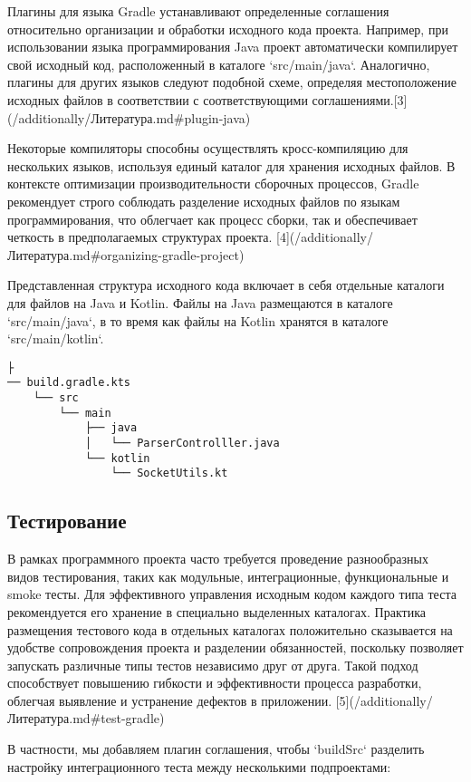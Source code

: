 Плагины для языка Gradle устанавливают определенные соглашения относительно организации и обработки
исходного кода проекта.
Например, при использовании языка программирования Java проект автоматически
компилирует
свой исходный код, расположенный в каталоге `src/main/java`.
Аналогично, плагины для других языков
следуют подобной схеме, определяя местоположение исходных файлов в соответствии с соответствующими
соглашениями.[3](/additionally/Литература.md\#plugin-java)

Некоторые компиляторы способны осуществлять кросс-компиляцию для нескольких языков, используя единый
каталог для хранения исходных файлов.
В контексте оптимизации производительности сборочных
процессов, Gradle рекомендует строго соблюдать
разделение исходных файлов по языкам программирования, что облегчает как процесс сборки, так и
обеспечивает четкость в предполагаемых структурах
проекта.
[4](/additionally/Литература.md\#organizing-gradle-project)

Представленная структура исходного кода включает в себя отдельные каталоги для файлов на Java и
Kotlin.
Файлы на Java размещаются в каталоге `src/main/java`, в то время как файлы на Kotlin
хранятся
в каталоге `src/main/kotlin`.

\begin{lstlisting}├
── build.gradle.kts
    └── src
        └── main
            ├── java
            │   └── ParserControlller.java
            └── kotlin
                └── SocketUtils.kt
\end{lstlisting}

\subsection{Тестирование}\label{subsec:}

В рамках программного проекта часто требуется проведение разнообразных видов тестирования, таких как
модульные, интеграционные, функциональные и smoke тесты.
Для эффективного управления исходным
кодом каждого типа теста рекомендуется его хранение в специально выделенных каталогах.
Практика
размещения тестового кода в отдельных каталогах положительно сказывается на удобстве сопровождения
проекта и разделении обязанностей, поскольку позволяет запускать различные типы тестов независимо
друг от друга.
Такой подход способствует повышению гибкости и эффективности процесса разработки,
облегчая выявление и устранение дефектов в приложении.
[5](/additionally/Литература.md\#test-gradle)

В частности, мы добавляем плагин соглашения, чтобы `buildSrc` разделить настройку интеграционного
теста между несколькими подпроектами:

